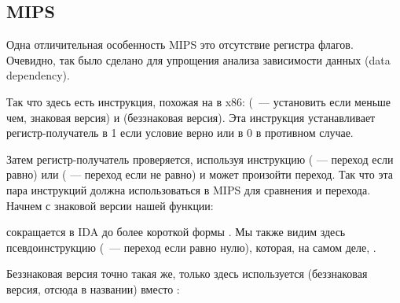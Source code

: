 ﻿\subsection{MIPS}

Одна отличительная особенность MIPS это отсутствие регистра флагов.
Очевидно, так было сделано для упрощения анализа зависимости данных (data dependency).

Так что здесь есть инструкция, похожая на  в x86:  (~--- установить если
меньше чем, знаковая версия) и  (беззнаковая версия).
Эта инструкция устанавливает регистр-получатель в 1 если условие верно или в 0 в противном случае.

Затем регистр-получатель проверяется, используя инструкцию 
 ( --- переход если равно) или  ( --- переход если не равно) 
и может произойти переход.
Так что эта пара инструкций должна использоваться в MIPS для сравнения и перехода.
Начнем с знаковой версии нашей функции:



 сокращается в IDA до более короткой формы .
Мы также видим здесь псевдоинструкцию  (~--- переход если равно нулю), 
которая, на самом деле, .

Беззнаковая версия точно такая же, только здесь используется  (беззнаковая версия, 
отсюда  в названии) вместо :




